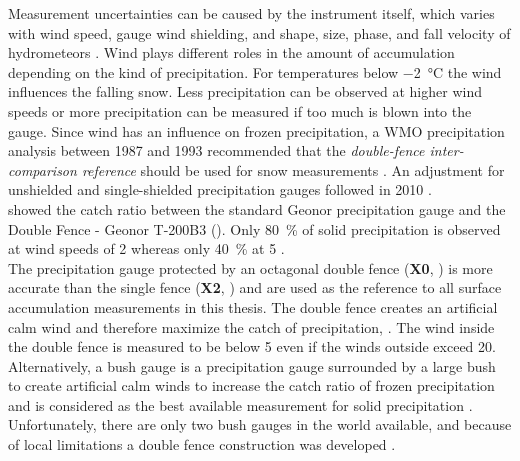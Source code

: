 Measurement uncertainties can be caused by the instrument itself, which varies with wind speed, gauge wind shielding, and shape, size, phase, and fall velocity of hydrometeors \citep{kochendorfer_analysis_2017,wolff_derivation_2015}. Wind plays different roles in the amount of accumulation depending on the kind of precipitation. For temperatures below \SI{-2}{\celsius} the wind influences the falling snow. Less precipitation can be observed at higher wind speeds or more precipitation can be measured if too much is blown into the gauge.
Since wind has an influence on frozen precipitation, a WMO precipitation analysis between 1987 and 1993 recommended that the \textit{double-fence inter-comparison reference} should be used for snow measurements \citep{goodison_wmo_1998}. An adjustment for unshielded and single-shielded precipitation gauges followed in 2010 \citep{nitu_cimo_2010}.
\\
\citet{wolff_derivation_2015} showed the catch ratio between the standard Geonor precipitation gauge and the Double Fence - Geonor T-200B3 (). Only \SI{80}{\percent} of solid precipitation is observed at wind speeds of \SI{2}{\mPs} whereas only \SI{40}{\percent} at \SI{5}{\mPs} \citep[][Figure 5]{wolff_derivation_2015}. 
\\
The precipitation gauge protected by an octagonal double fence (\textbf{X0}, ) is more accurate than the single fence (\textbf{X2}, ) and are used as the reference to all surface accumulation measurements in this thesis. 
The double fence creates an artificial calm wind and therefore maximize the catch of precipitation, \citep{ wolff_derivation_2015}. The wind inside the double fence is measured to be below \SI{5}{\mPs} even if the winds outside exceed \SI{20}{\mPs}. %
Alternatively, a bush gauge is a precipitation gauge surrounded by a large bush to create artificial calm winds to increase the catch ratio of frozen precipitation and is considered as the best available measurement for solid precipitation \citep[unpublished]{wolff_wmo_2018}. Unfortunately, there are only two bush gauges in the world available, and because of local limitations a double fence construction was developed \citep{goodison_wmo_1998}. %
